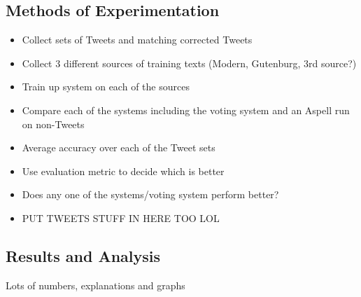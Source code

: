 \subsection{Methods of Experimentation}
\begin{itemize}
	\item Collect sets of Tweets and matching corrected Tweets
	\item Collect 3 different sources of training texts (Modern, Gutenburg, 3rd source?)
	\item Train up system on each of the sources
	\item Compare each of the systems including the voting system and an Aspell run on non-Tweets
	\item Average accuracy over each of the Tweet sets
	\item Use evaluation metric to decide which is better
	\item Does any one of the systems/voting system perform better?
	\item PUT TWEETS STUFF IN HERE TOO LOL
\end{itemize}

\subsection{Results and Analysis}
Lots of numbers, explanations and graphs